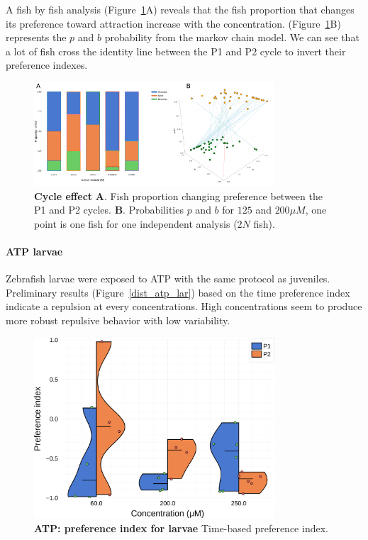   A fish by fish analysis (Figure~\ref{proportion}A) reveals that the fish proportion that changes its preference toward attraction increase with the concentration. (Figure~\ref{proportion}B) represents the $p$ and $b$ probability from the markov chain model. We can see that a lot of fish cross the identity line between the P1 and P2 cycle to invert their preference indexes.
    \begin{figure}[h!]
      \centering
      \includegraphics[width=0.8\textwidth]{part_2/assets/proportion.png}
      \caption{\textbf{Cycle effect} \textbf{A}. Fish proportion changing preference between the P1 and P2 cycles. \textbf{B}. Probabilities $p$ and $b$ for $125$ and $200 \mu M$, one point is one fish for one independent analysis ($2N$ fish).}
      \label{proportion}
    \end{figure}

    \paragraph{ATP larvae} Zebrafish larvae were exposed to ATP with the same protocol as juveniles. Preliminary results (Figure~\ref{dist_atp_lar}) based on the time preference index indicate a repulsion at every concentrations. High concentrations seem to produce more robust repulsive behavior with low variability.

    \begin{figure}[h!]
      \centering
      \includegraphics[width=0.8\textwidth]{part_2/assets/dist_atp_lar.png}
      \caption{\textbf{ATP: preference index for larvae} Time-based preference index. }
      \label{dist_atp}
    \end{figure}

